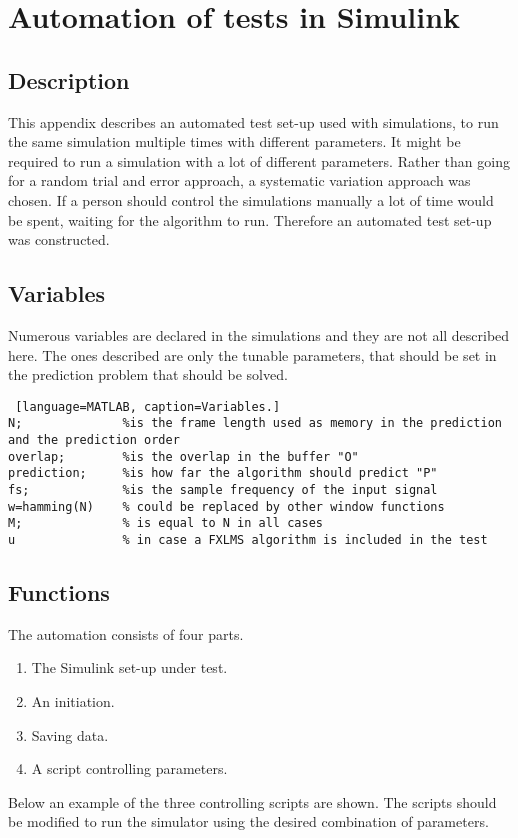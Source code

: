 \section{Automation of tests in Simulink} \label{sec:SimulinkAuto}
\subsection{Description}
This appendix describes an automated test set-up used with simulations, to run the same simulation multiple times with different parameters.
It might be required to run a simulation with a lot of different parameters. Rather than going for a random trial and error approach, a systematic variation approach was chosen. If a person should control the simulations manually a lot of time would be spent, waiting for the algorithm to run. Therefore an automated test set-up was constructed. 

\subsection{Variables}
Numerous variables are declared in the simulations and they are not all described here. The ones described are only the tunable parameters, that should be set in the prediction problem that should be solved. 
\begin{lstlisting} [language=MATLAB, caption=Variables.]
N; 				%is the frame length used as memory in the prediction and the prediction order
overlap;		%is the overlap in the buffer "O"
prediction; 	%is how far the algorithm should predict "P"
fs; 			%is the sample frequency of the input signal 
w=hamming(N)	% could be replaced by other window functions
M;				% is equal to N in all cases
u 				% in case a FXLMS algorithm is included in the test
\end{lstlisting}

\subsection{Functions}
 The automation consists of four parts. 
\begin{enumerate}
	\item The Simulink set-up under test. 
	\item An initiation. 
	\item Saving data.
	\item A script controlling parameters. 
\end{enumerate}  

Below an example of the three controlling scripts are shown. The  scripts should be modified to run the simulator using the desired combination of parameters.

